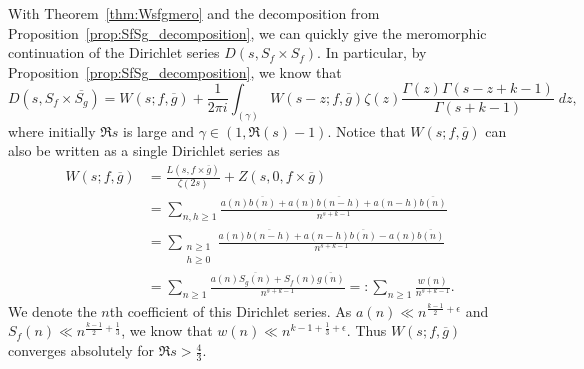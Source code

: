 With Theorem~\ref{thm:Wsfgmero} and the decomposition from
Proposition~\ref{prop:SfSg_decomposition}, we can quickly give the meromorphic
continuation of the Dirichlet series $D(s, S_f \times S_f)$.
In particular, by Proposition~\ref{prop:SfSg_decomposition}, we know that
\begin{equation}
  D(s, S_f \times \overline{S_g}) = W(s; f, \overline{g}) + \frac{1}{2\pi i}
  \int_{(\gamma)} W(s-z; f, \overline{g}) \zeta(z)\frac{\Gamma(z) \Gamma(s - z + k -
  1)}{\Gamma(s + k - 1)} \; dz,
\end{equation}
where initially $\Re s$ is large and $\gamma \in (1, \Re(s) - 1)$.
Notice that $W(s; f, \overline{g})$ can also be written as a single Dirichlet series as
\begin{align}
  W(s; f, \overline{g}) &= \frac{L(s, f\times \overline{g})}{\zeta(2s)} + Z(s, 0, f\times
  \overline{g}) \\
  &= \sum_{n,h \geq 1} \frac{a(n) \overline{b(n)} + a(n)\overline{b(n-h)} +
  a(n-h)\overline{b(n)}}{n^{s + k - 1}} \\
  &= \sum_{\substack{n \geq 1 \\ h \geq 0}} \frac{a(n)\overline{b(n-h)} +
  a(n-h)\overline{b(n)} - a(n)\overline{b(n)}}{n^{s + k - 1}} \\
  &= \sum_{n \geq 1} \frac{a(n) \overline{S_g(n)} + S_f(n) \overline{g(n)}}{n^{s + k - 1}}
  =: \sum_{n \geq 1} \frac{w(n)}{n^{s + k - 1}}.
\end{align}
We denote the $n$th coefficient of this Dirichlet series.
As $a(n) \ll n^{\frac{k-1}{2} + \epsilon}$ and $S_f(n) \ll n^{\frac{k-1}{2} +
\frac{1}{3}}$, we know that $w(n) \ll n^{k-1 + \frac{1}{3} + \epsilon}$.
Thus $W(s; f, \overline{g})$ converges absolutely for $\Re s > \frac{4}{3}$.


